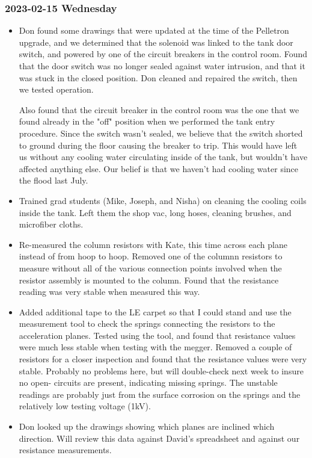 \documentclass{scrartcl}
\begin{document}
\subsubsection{2023-02-15 Wednesday}
\begin{itemize}
    \item Don found some drawings that were updated at the time of the 
    Pelletron upgrade, and we determined that the solenoid was linked to
	the tank door switch, and powered by one of the circuit breakers in
	the control room.  Found that the door switch was no longer sealed
	against water intrusion, and that it was stuck in the closed position.
	Don cleaned and repaired the switch, then we tested operation.  \par
	Also found that the circuit breaker in the control room was the one
	that we found already in the "off" position when we performed the 
	tank entry procedure.  Since the switch wasn't sealed, we believe
	that the switch shorted to ground during the floor causing the breaker
	to trip.  This would have left us without any cooling water circulating
	inside of the tank, but wouldn't have affected anything else.  Our 
	belief is that we haven't had cooling water since the flood last July.
	\item Trained grad students (Mike, Joseph, and Nisha) on cleaning the
	cooling coils inside the tank.  Left them the shop vac, long hoses,
	cleaning brushes, and microfiber cloths.
	\item Re-measured the column resistors with Kate, this time across 
	each plane instead of from hoop to hoop.  Removed one of the columnn
	resistors to measure without all of the various connection points
	involved when the resistor assembly is mounted to the column.  Found
	that the resistance reading was very stable when measured this way.
	\item Added additional tape to the LE carpet so that I could stand
	and use the measurement tool to check the springs connecting the
	resistors to the acceleration planes.  Tested using the tool, and
	found that resistance values were much less stable when testing 
	with the megger.  Removed a couple of resistors for a closer inspection
    and found that the resistance values were very stable.  Probably 
	no problems here, but will double-check next week to insure no open-
	circuits are present, indicating missing springs.  The unstable readings
	are probably just from the surface corrosion on the springs and the 
	relatively low testing voltage (1kV).  
	\item Don looked up the drawings showing which planes are inclined 
	which direction.  Will review this data against David's spreadsheet
	and against our resistance measurements.  
\end{itemize}
\end{document}
